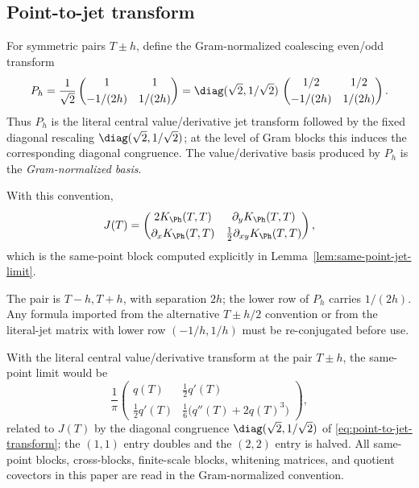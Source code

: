 \subsection{Point-to-jet transform}
\label{subsec:point-to-jet-transform}

For symmetric pairs \(T\pm h\), define the Gram-normalized coalescing
even/odd transform
\begin{equation}
\label{eq:point-to-jet-transform}
P_h
=\frac1{\sqrt2}
\begin{pmatrix}
1 & 1\\[0.6ex]
-1/(2h) & 1/(2h)
\end{pmatrix}
=\diag(\sqrt 2, 1/\sqrt 2)\,
\begin{pmatrix}
1/2 & 1/2\\[0.6ex]
-1/(2h) & 1/(2h)
\end{pmatrix}.
\end{equation}
Thus \(P_h\) is the literal central value/derivative jet transform
followed by the fixed diagonal rescaling
\(\diag(\sqrt 2, 1/\sqrt 2)\); at the level of Gram blocks this induces
the corresponding diagonal congruence.  The value/derivative basis
produced by \(P_h\) is the \emph{Gram-normalized basis}.

With this convention,
\begin{equation}
\label{eq:same-point-as-kernel-derivatives}
J(T)=
\begin{pmatrix}
2K_\Ph(T,T) & \partial_y K_\Ph(T,T)\\[0.6ex]
\partial_x K_\Ph(T,T) & \tfrac12 \partial_{xy} K_\Ph(T,T)
\end{pmatrix},
\end{equation}
which is the same-point block computed explicitly in
Lemma~\ref{lem:same-point-jet-limit}.

\begin{remark}
\label{rem:pair-separation-convention}
The pair is \(T-h, T+h\), with separation \(2h\); the lower row of
\(P_h\) carries \(1/(2h)\).  Any formula imported from the alternative
\(T\pm h/2\) convention or from the literal-jet matrix with lower row
\((-1/h, 1/h)\) must be re-conjugated before use.
\end{remark}

\begin{remark}
\label{rem:normalization-audit}
With the literal central value/derivative transform at the pair
\(T\pm h\), the same-point limit would be
\[
\frac1\pi
\begin{pmatrix}
q(T) & \tfrac12 q'(T)\\[0.6ex]
\tfrac12 q'(T) & \tfrac16\bigl(q''(T)+2q(T)^3\bigr)
\end{pmatrix},
\]
related to \(J(T)\) by the diagonal congruence
\(\diag(\sqrt 2, 1/\sqrt 2)\) of \eqref{eq:point-to-jet-transform}; the
\((1,1)\) entry doubles and the \((2,2)\) entry is halved.  All
same-point blocks, cross-blocks, finite-scale blocks, whitening
matrices, and quotient covectors in this paper are read in the
Gram-normalized convention.
\end{remark}

